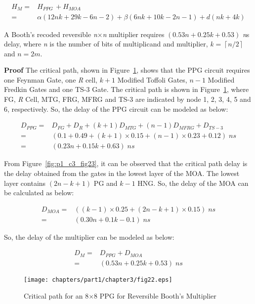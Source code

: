 \begin{align*}
H_{M}=& H_{PPG\ }+ H_{MOA}\\
=& \alpha(12nk+29k-6n-2)+\beta(6nk+10k-2n-1)+d(nk+4k)	
\end{align*}

\begin{property}\textnormal{
A Booth's recoded reversible \textit{n$\times $n }multiplier requires $(0.53n + 0.25k + 0.53)$ \textit{n}s delay, where \textit{n} is the number of bits of multiplicand and multiplier, \textit{k} = $\left\lceil n/2\right\rceil $ and $n=2m$.}
\end{property}

\textnormal\textbf{Proof}
The critical path, shown in Figure~\ref{fig:p1_c3_fig22}, shows that the PPG circuit requires one Feynman Gate, one \textit{R} cell, $k+1$ Modified Toffoli Gates, $n-1$ Modified Fredkin Gates and one TS-3 Gate. The critical path is shown in Figure~\ref{fig:p1_c3_fig22}, where FG, \textit{R} Cell, MTG, FRG, MFRG and TS-3 are indicated by node 1, 2, 3, 4, 5 and 6, respectively. So, the delay of the PPG circuit can be modeled as below:


\begin{align*}
 D_{PPG} =& D_{FG} + D_{R} + (k+1) D_{MTG} + (n-1) D_{MFRG} + D_{TS-3}\\
=&(0.1 + 0.49 + (k+1)\times  0.15 + (n-1)\times  0.23 + 0.12) \;ns\\
=&(0.23n + 0.15k + 0.63) \;ns
\end{align*}

\noindent From Figure~\ref{fig:p1_c3_fig23}, it can be observed that the critical path delay is the delay obtained from the gates in the lowest layer of the MOA. The lowest layer contains $(2n-k+1)$ PG and $k-1$ HNG. So, the delay of the MOA can be calculated as below:


\begin{align*}
D_{MOA} =& ((k -1)\times 0.25+ (2n-k+1)\times 0.15) \;ns\\
=& (0.30n + 0.1k -0.1) \;ns
\end{align*}

\noindent So, the delay of the multiplier can be modeled as below:


\begin{align*}
D_{M}  =& D_{PPG} + D_{MOA}\\
=&(0.53n+0.25k+0.53) \;ns
\end{align*}

\begin{figure}[H]
	\centering
	\texttt{[image: chapters/part1/chapter3/fig22.eps]}
	\caption{Critical path for an {8$\times $8} PPG for Reversible Booth's Multiplier}
	\label{fig:p1_c3_fig22}
\end{figure}

